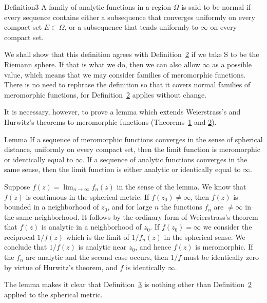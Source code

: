 \begin{originalstatement}{Definition}{3}\label{def:5.3}
A family of analytic functions in a region $\Omega$ is said to be normal if every sequence contains either a subsequence that converges uniformly on every compact set $E \subset \Omega$, or a subsequence that tends uniformly to $\infty$ on every compact set.
\end{originalstatement}
We shall show that this definition agrees with Definition~\hyperref[def:5.2]{2} if we take S to be the Riemann sphere. If that is what we do, then we can also allow $\infty$ as a possible value, which means that we may consider families of meromorphic functions. There is no need to rephrase the definition so that it covers normal families of meromorphic functions, for Definition~\hyperref[def:5.2]{2} applies without change.

It is necessary, however, to prove a lemma which extends Weierstrass's and Hurwitz's theorems to meromorphic functions (Theorems~\hyperref[thm:5.1]{1} and \hyperref[thm:5.2]{2}).


\begin{originalstatement}{Lemma}{}\label{lem:5.unnumbered-p242-b0}
If a sequence of meromorphic functions converges in the sense of spherical distance, uniformly on every compact set, then the limit function is meromorphic or identically equal to $\infty$.
If a sequence of analytic functions converges in the same sense, then the limit function is either analytic or identically equal to $\infty$.
\end{originalstatement}

Suppose $f(z) = \lim_{n\to \infty}f_n(z)$ in the sense of the lemma. We know that $f(z)$ is continuous in the spherical metric. If $f(z_0)\neq \infty$, then $f(z)$ is bounded in a neighborhood of $z_0$, and for large $n$ the functions $f_{n}$ are $\neq \infty$ in the same neighborhood. It follows by the ordinary form of Weierstrass's theorem that $f(z)$ is analytic in a neighborhood of $z_0$. If $f(z_0) = \infty$ we consider the reciprocal $1 / f(z)$ which is the limit of $1 / f_{n}(z)$ in the spherical sense. We conclude that $1 / f(z)$ is analytic near $z_0$, and hence $f(z)$ is meromorphic. If the $f_{n}$ are analytic and the second case occurs, then $1 / f$ must be identically zero by virtue of Hurwitz's theorem, and $f$ is identically $\infty$.

The lemma makes it clear that Definition~\hyperref[def:5.3]{3} is nothing other than Definition~\hyperref[def:5.2]{2} applied to the spherical metric.

